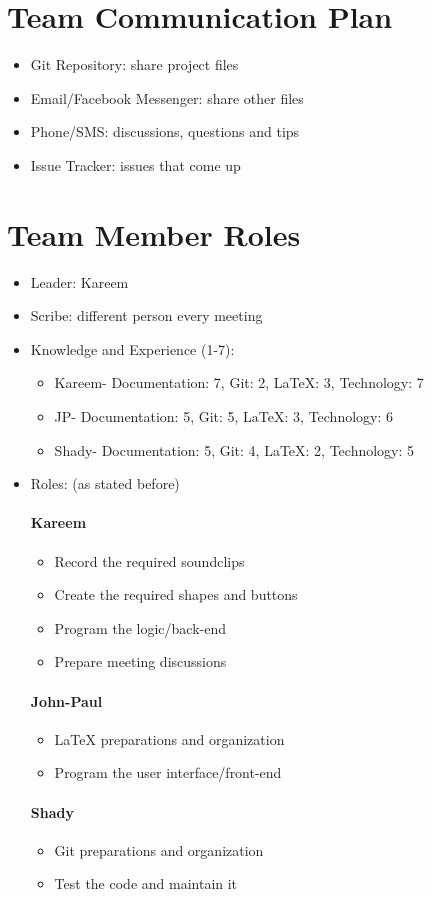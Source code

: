 \documentclass{article}
\begin{document}
\section{Team Communication Plan}
\begin{itemize}
\item Git Repository: share project files
\item Email/Facebook Messenger: share other files
\item Phone/SMS: discussions, questions and tips
\item Issue Tracker: issues that come up
\end{itemize}
\section{Team Member Roles}
\begin{itemize}
\item Leader: Kareem
\item Scribe: different person every meeting
\item Knowledge and Experience (1-7):
\begin{itemize}
\item Kareem- Documentation: 7, Git: 2, LaTeX: 3, Technology: 7
\item  JP- Documentation: 5, Git: 5, LaTeX: 3, Technology: 6
\item Shady- Documentation: 5, Git: 4, LaTeX: 2, Technology: 5
\end{itemize}
\item Roles: (as stated before)
\paragraph{Kareem}
\begin{itemize}
\item Record the required soundclips
\item Create the required shapes and buttons
\item Program the logic/back-end
\item Prepare meeting discussions
\end{itemize}
\paragraph{John-Paul}
\begin{itemize}
\item LaTeX preparations and organization
\item Program the user interface/front-end
\end{itemize}
\paragraph{Shady}
\begin{itemize}
\item Git preparations and organization
\item Test the code and maintain it
\end{itemize}
\end{itemize}
\end{document}
